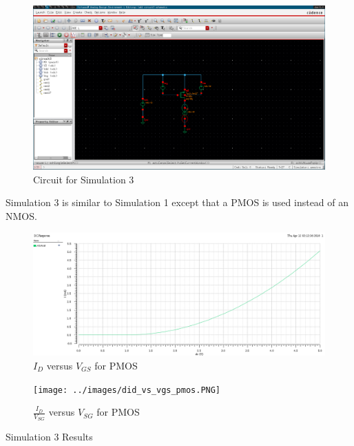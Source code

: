 \FloatBarrier

\begin{figure}[h!]
	\centering
	\includegraphics[scale=0.75]{../images/circuit3.PNG}
	\caption{Circuit for Simulation 3}
	\label{fig:circuit3}
\end{figure}

\FloatBarrier

Simulation 3 is similar to Simulation 1 except that a PMOS is used instead of an NMOS.

\FloatBarrier

\begin{figure}[h!]
	\centering
	\includegraphics[scale=0.75]{../images/id_vs_vgs_pmos.PNG}
	\caption{$I_{D}$ versus $V_{GS}$ for PMOS}
	\label{fig:id_vs_vgs_pmos}
\end{figure}

\FloatBarrier

\FloatBarrier

\begin{figure}[h!]
	\centering
	\texttt{[image: ../images/did\_vs\_vgs\_pmos.PNG]}
	\caption{$\frac{I_{D}}{V_{SG}}$ versus $V_{SG}$ for PMOS}
	\label{fig:did_vs_vgs_pmos}
\end{figure}

\FloatBarrier

\FloatBarrier

\begin{table}[h!]
	\centering
	\caption{Simulation 3 Results}
	\label{tab:sim3_results}
\end{table}

\FloatBarrier
